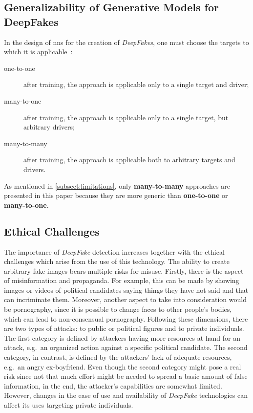 \subsection{Generalizability of Generative Models for DeepFakes}\label{subsubsect:generalizability-deepfakes}
In the design of \glspl{nn} for the creation of \textit{DeepFakes}, one must choose the
targets to which it is applicable~\cite[cf.][]{Mirsky.2020}:
\begin{description}
    \item[one-to-one] after training, the approach is applicable only to a
    single target and driver;
    \item[many-to-one] after training, the approach is applicable only to a
    single target, but arbitrary drivers;
    \item[many-to-many] after training, the approach is applicable both to
    arbitrary targets and drivers.
\end{description}
As mentioned in \cref{subsect:limitations}, only \textbf{many-to-many} approaches
are presented in this paper because they are more generic than \textbf{one-to-one} or
\textbf{many-to-one}.

\subsection{Ethical Challenges}
The importance of \textit{DeepFake} detection increases together with the ethical
challenges which arise from the use of this technology. The ability to create
arbitrary fake images bears multiple risks for misuse. Firstly, there is the
aspect of misinformation and propaganda. For example, this can be made by showing images or videos
of political candidates saying things they have not said and that can incriminate
them. Moreover, another aspect to take into consideration would be pornography,
since it is possible to change faces to other people's bodies, which can lead to
non-consensual pornography. Following these dimensions, there are two types of attacks: to public or political figures and to private individuals. The first category
is defined by attackers having more resources at hand for an attack, e.g.\ an
organized action against a specific political candidate. The second category, in 
contrast, is defined by the attackers' lack of adequate resources, e.g.\ an angry 
ex-boyfriend. Even though the second category might pose a real risk since not 
that much effort might be needed to spread a basic amount of false information, in the 
end, the attacker's capabilities are somewhat limited. However, changes in the ease of use and 
availability of \textit{DeepFake} technologies can affect its uses targeting private individuals.